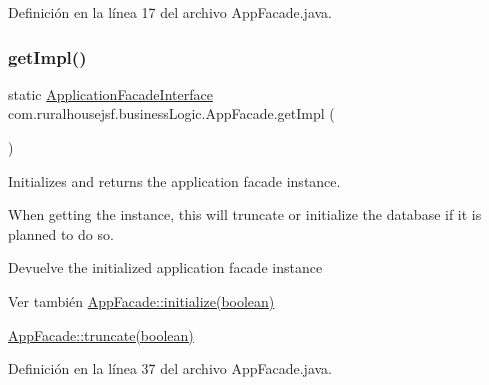 Definición en la línea 17 del archivo App\+Facade.\+java.

\mbox{\label{classcom_1_1ruralhousejsf_1_1business_logic_1_1_app_facade_a029bcceee98b9070b9f80abc54db45d6}} 
\subsubsection{\texorpdfstring{getImpl()}{getImpl()}\hspace{0.1cm}{\footnotesize\ttfamily [1/3]}}
{\footnotesize\ttfamily static \mbox{\hyperlink{interfacecom_1_1ruralhousejsf_1_1business_logic_1_1_application_facade_interface}{Application\+Facade\+Interface}} com.\+ruralhousejsf.\+business\+Logic.\+App\+Facade.\+get\+Impl (\begin{DoxyParamCaption}{ }\end{DoxyParamCaption})\hspace{0.3cm}{\ttfamily [static]}}

Initializes and returns the application facade instance. 

When getting the instance, this will truncate or initialize the database if it is planned to do so.

\begin{DoxyReturn}{Devuelve}
the initialized application facade instance
\end{DoxyReturn}
\begin{DoxySeeAlso}{Ver también}
\mbox{\hyperlink{classcom_1_1ruralhousejsf_1_1business_logic_1_1_app_facade_a48252ec119a6bb16f5353df6ec6eff54}{App\+Facade\+::initialize(boolean)}} 

\mbox{\hyperlink{classcom_1_1ruralhousejsf_1_1business_logic_1_1_app_facade_a98aed1ed8a03c6a92e15121fed4eb452}{App\+Facade\+::truncate(boolean)}} 
\end{DoxySeeAlso}


Definición en la línea 37 del archivo App\+Facade.\+java.

\mbox{\label{classcom_1_1ruralhousejsf_1_1business_logic_1_1_app_facade_aa4bf7166aae19a2d640fd6ab8a0fff96}} 
